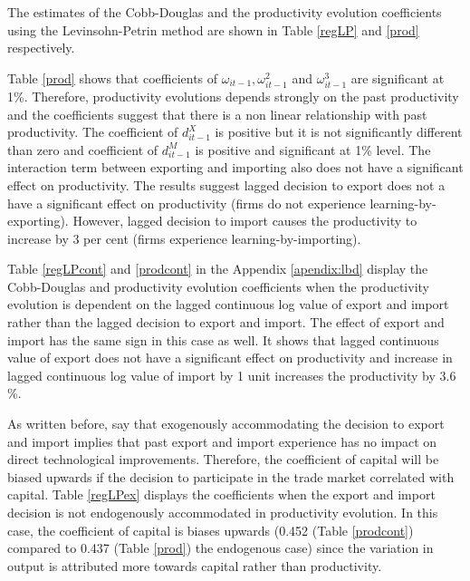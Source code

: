 \documentclass[12pt]{article}
\begin{document}
The estimates of the Cobb-Douglas and  the productivity evolution
coefficients  using the Levinsohn-Petrin
method are shown in Table \ref{regLP} and \ref{prod}  respectively. 

 
Table \ref{prod} shows that coefficients of $\omega_{it-1},
\omega_{it-1}^{2}$ and $\omega_{it-1}^{3}$ are significant at 1\%. Therefore, productivity evolutions depends strongly
on the past productivity and the coefficients suggest that there is a
non linear relationship with past
productivity. The coefficient of $d_{it-1}^{X}$ is positive but it is
not significantly different than zero and  coefficient of
$d_{it-1}^{M}$  is positive and significant at 1\% level. The
interaction term between exporting and importing also does not have a significant effect on productivity.
The results suggest lagged decision to export does not a have
a significant effect on productivity (firms do not experience learning-by-exporting). However, 
lagged decision to import causes the productivity to increase by 3 per
cent (firms experience learning-by-importing).  


Table \ref{regLPcont} and \ref{prodcont} in the Appendix \ref{apendix:lbd} display the Cobb-Douglas and
productivity evolution
coefficients  when the
productivity evolution is dependent on the lagged continuous log value of export
and import rather than the lagged decision to export and import.
The effect of export and import has the same sign in this case as
well. It shows that lagged
continuous value of export does not have a significant effect on
productivity and  increase in lagged continuous log value of import  by 1 unit
increases the productivity by 3.6 \%.  


As written before, \textcite{de2013detecting} say that exogenously accommodating the
decision to export and import implies that
past export and import experience has no impact on direct technological
improvements. Therefore, the coefficient of capital will be biased
upwards if the decision to participate in the trade market correlated with capital. Table
\ref{regLPex} displays the coefficients when the export and import
decision is not endogenously accommodated in 
productivity evolution. In this case, the coefficient of capital is
biases upwards (0.452 (Table \ref{prodcont}) compared to 0.437 (Table \ref{prod}) the endogenous case)  since
the variation in output is attributed more towards capital rather than productivity.   

\end{document}
